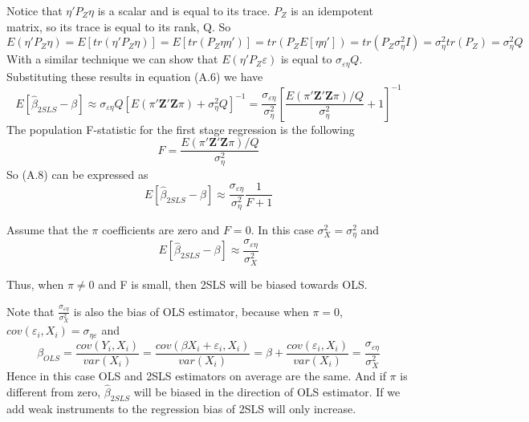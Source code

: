 Notice that ${\eta }'P_{Z}\eta$ is a scalar and is equal to its trace. $P_{Z}$ is an idempotent matrix, so its trace is equal to its rank, Q. So
\begin{equation}
    E({\eta }'P_{Z}\eta)=E[tr({\eta }'P_{Z}\eta)]=E[tr(P_{Z}\eta{\eta }')]=tr(P_{Z}E[\eta{\eta }'])=tr(P_{Z}\sigma _{\eta }^{2}I)=\sigma _{\eta }^{2}tr(P_{Z})=\sigma _{\eta }^{2}Q
\end{equation}
With a similar technique we can show that  $E({\eta }'P_{Z}\varepsilon)$ is equal to $\sigma _{\varepsilon \eta }Q$.
Substituting these results in equation (A.6) we have
\begin{equation}
   E[\hat{\beta }_{2SLS}-\beta]\approx\sigma _{\varepsilon \eta }Q[E({\pi }'{\textbf{Z}}'\textbf{Z}\pi )+\sigma _{\eta }^{2}Q]^{-1}=\frac{\sigma_{\varepsilon\eta }}{\sigma  _{\eta }^{2}}[\frac{E(\pi'\textbf{Z}'\textbf{Z}\pi)/Q}{\sigma _{\eta }^{2}}+1]^{-1}
\end{equation}
The population F-statistic for the first stage regression is the following
\begin{equation}
    F=\frac{E(\pi'\textbf{Z}'\textbf{Z}\pi)/Q}{\sigma _{\eta }^{2}}
    \end{equation}
So (A.8) can be expressed as
\begin{equation}
    E[\hat{\beta }_{2SLS}-\beta]\approx \frac{\sigma_{\varepsilon\eta }}{\sigma  _{\eta }^{2}}\frac{1}{F+1}
\end{equation}

Assume that the ${\pi}$ coefficients are zero and $F=0$. In this case $\sigma_{X}^{2}=\sigma_{\eta }^{2}$ and
\begin{equation}
    E[\hat{\beta }_{2SLS}-\beta]\approx \frac{\sigma_{\varepsilon\eta }}{\sigma  _{X}^{2}}
\end{equation}

Thus, when $\pi\neq 0$ and F is small, then 2SLS will be biased towards OLS. 

Note that $\frac{\sigma_{\varepsilon\eta }}{\sigma  _{X}^{2}}$ is also the bias of OLS estimator, because when $\pi=0$, $cov(\varepsilon _{i},X_{i})=\sigma _{\eta \varepsilon }$ and
\begin{equation}
    \beta _{OLS} = \frac{cov(Y_{i},X_{i})}{var(X_{i})} = \frac{cov(\beta X_{i}+\varepsilon  _{i},X_{i})}{var(X_{i})} = \beta + \frac{cov(\varepsilon  _{i},X_{i})}{var(X_{i})} = \frac{\sigma _{\varepsilon \eta }}{\sigma _{X}^{2}}
\end{equation}
Hence in this case OLS and 2SLS estimators on average are the same. And if $\pi$ is different from zero, $\hat{\beta }_{2SLS}$ will be biased in the direction of OLS estimator. If we add weak instruments to the regression bias of 2SLS will only increase. \\

\newpage


